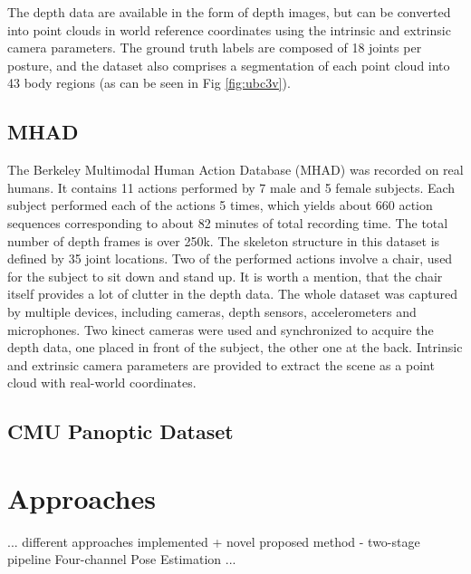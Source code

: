 \noindent
 The depth data are available in the form of depth images, but can be converted into point clouds in world reference coordinates using the intrinsic and extrinsic camera parameters. The ground truth labels are composed of 18 joints per posture, and the dataset also comprises a segmentation of each point cloud into 43 body regions (as can be seen in Fig \ref{fig:ubc3v}).

\subsection{MHAD}
The Berkeley Multimodal Human Action Database (MHAD) \cite{Vidal:2013:BMC:2478277.2478412} was recorded on real humans. It contains 11 actions performed by 7 male and 5 female subjects. Each subject performed each of the actions 5 times, which yields about 660 action sequences corresponding to about 82 minutes of total recording time. The total number of depth frames is over 250k. The skeleton structure in this dataset is defined by 35 joint locations. Two of the performed actions involve a chair, used for the subject to sit down and stand up. It is worth a mention, that the chair itself provides a lot of clutter in the depth data. The whole dataset was captured by multiple devices, including cameras, depth sensors, accelerometers and microphones. Two kinect cameras were used and synchronized to acquire the depth data, one placed in front of the subject, the other one at the back. Intrinsic and extrinsic camera parameters are provided to extract the scene as a point cloud with real-world coordinates.\par

\subsection{CMU Panoptic Dataset}
\cite{Joo_2017_TPAMI}


\section{Approaches}
... different approaches implemented + novel proposed method - two-stage pipeline Four-channel Pose Estimation ...


